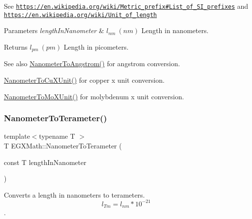 See \href{https://en.wikipedia.org/wiki/Metric_prefix#List_of_SI_prefixes}{\tt https\+://en.\+wikipedia.\+org/wiki/\+Metric\+\_\+prefix\#\+List\+\_\+of\+\_\+\+S\+I\+\_\+prefixes} and \href{https://en.wikipedia.org/wiki/Unit_of_length}{\tt https\+://en.\+wikipedia.\+org/wiki/\+Unit\+\_\+of\+\_\+length} 
\begin{DoxyParams}{Parameters}
{\em length\+In\+Nanometer} & $ l_{nm}\ (nm)$ Length in nanometers. \\
\hline
\end{DoxyParams}
\begin{DoxyReturn}{Returns}
$ l_{pm}\ (pm)$ Length in picometers. 
\end{DoxyReturn}
\begin{DoxySeeAlso}{See also}
\mbox{\hyperlink{group___e_g_x_math-_conversions-_length_conversions-_s_i-_nanometer-_non-_s_i_ga7e2062d4cc1a422e54da597c4413efb1}{Nanometer\+To\+Angstrom()}} for angstrom conversion. 

\mbox{\hyperlink{group___e_g_x_math-_conversions-_length_conversions-_s_i-_nanometer-_non-_s_i_ga59399657caa5a9c81df2ffbe1ff7683c}{Nanometer\+To\+Cu\+X\+Unit()}} for copper x unit conversion. 

\mbox{\hyperlink{group___e_g_x_math-_conversions-_length_conversions-_s_i-_nanometer-_non-_s_i_gacc6d7fa95c35687718c816df3c95c7b5}{Nanometer\+To\+Mo\+X\+Unit()}} for molybdenum x unit conversion. 
\end{DoxySeeAlso}
\mbox{\label{group___e_g_x_math-_conversions-_length_conversions-_s_i-_nanometer-_s_i_gacca577403e34659fd6bccf40885704fc}} 
\subsubsection{\texorpdfstring{Nanometer\+To\+Terameter()}{NanometerToTerameter()}}
{\footnotesize\ttfamily template$<$typename T $>$ \\
T E\+G\+X\+Math\+::\+Nanometer\+To\+Terameter (\begin{DoxyParamCaption}\item[{const T}]{length\+In\+Nanometer }\end{DoxyParamCaption})}



Converts a length in nanometers to terameters. \[ l_{Tm}=l_{nm} * 10^{-21} \]. 


